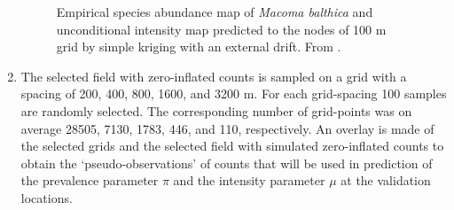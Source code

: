 \documentclass[review]{elsarticle}
\begin{document}
\begin{enumerate}
\begin{figure}[htbp]
\quad
{}
\caption{Empirical species abundance map of \textit{Macoma balthica} \protect{} and unconditional intensity map \protect{} predicted to the nodes of 100 m grid by simple kriging with an external drift. From \citet{lyashevska2016a}.}
\label{fig:rawfield}
\end{figure}

\item
The selected field with zero-inflated counts is sampled on a grid with a spacing of 200, 400, 800, 1600, and 3200 m. For each grid-spacing 100 samples are randomly selected. The corresponding number of grid-points was on average 28505, 7130, 1783, 446, and 110, respectively. An overlay is made of the selected grids and the selected field with simulated zero-inflated counts to obtain the `pseudo-observations' of counts that will be used in prediction of the prevalence parameter $\pi$ and the intensity parameter $\mu$ at the validation locations.


\end{enumerate}
\end{document}
